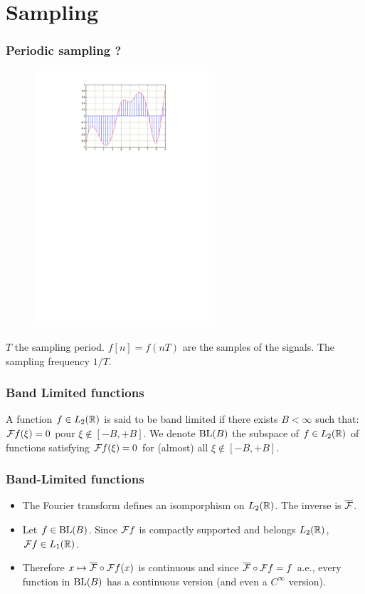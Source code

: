 \section{Sampling}
\begin{frame}
\frametitle{Periodic sampling ?}
\begin{figure}
  \centering
  \includegraphics[width=0.6\textwidth]{sampling}\\
\end{figure}
\alert{$T$} the \alert{sampling period}. \alert{$f[n]= f(nT)$} are the samples of the signals.
The \alert{sampling frequency} \alert{$1/T$}.
\end{frame}


\begin{frame}
\frametitle{Band Limited functions}
\begin{definition}
A function $f \in L_2(\mathbb{R})$ is said to be  \alert{band limited} if there exists $B < \infty$ such that: $\mathcal{F} f(\xi) = 0$ pour $\xi \not \in [-B,+B]$. We denote $\mathrm{BL}(B)$ the subspace of $f \in L_2(\mathbb{R})$ of functions satisfying $\mathcal{F} f(\xi) = 0$ for (almost) all $\xi \not \in [-B,+B]$.
\end{definition}
\end{frame}

\begin{frame}
\frametitle{Band-Limited functions}
\begin{itemize}
\item The Fourier transform defines an isomporphism on $L_2(\mathbb{R})$. The inverse is $\overline{\mathcal{F}}$.
\item Let  $f \in \mathrm{BL}(B)$. Since $\mathcal{F} f$ is compactly supported and belongs $L_2(\mathbb{R})$, $\mathcal{F} f  \in L_1(\mathbb{R})$.
\item Therefore $x \mapsto \overline{\mathcal{F}} \circ \mathcal{F} f(x)$ is continuous and since $\overline{\mathcal{F}} \circ \mathcal{F} f= f$ a.e., every function in $\mathrm{BL}(B)$ has a continuous version (and even a $C^\infty$ version).
\end{itemize}
\end{frame}

